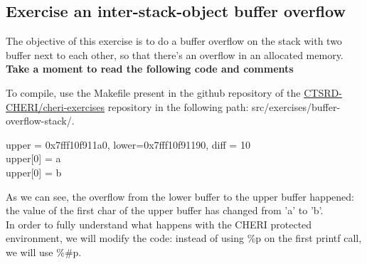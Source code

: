 \documentclass[a4paper, 11pt]{article}
\newcommand{\xmark}{\ding{55}}
\begin{document}
\subsection{Exercise an inter-stack-object buffer overflow}
	The objective of this exercise is to do a buffer overflow on the stack with two buffer next to each other, so that there's an overflow in an allocated memory.
	\textbf{Take a moment to read the following code and comments}
	

	\begin{center}
	\end{center}


To compile, use the Makefile present in the github repository of the \href{https://github.com/CTSRD-CHERI/cheri-exercises}{CTSRD-CHERI/cheri-exercises} repository in the following path: src/exercises/buffer-overflow-stack/. 

\begin{tcolorbox}[colback=gray!5!white, colframe=gray!75!black, title=Output on a classic \Gls{risc-v} environment (no CHERI Protection)]
upper = 0x7fff10f911a0, lower=0x7fff10f91190, diff = 10\\
upper[0] = a\\
upper[0] = b
\end{tcolorbox}
As we can see, the overflow from the lower buffer to the upper buffer happened: the value of the first char of the upper buffer has changed from 'a' to 'b'.\\
In order to fully understand what happens with the CHERI protected environment, we will modify the code: instead of using \%p on the first printf call, we will use \%\#p.
\end{document}
